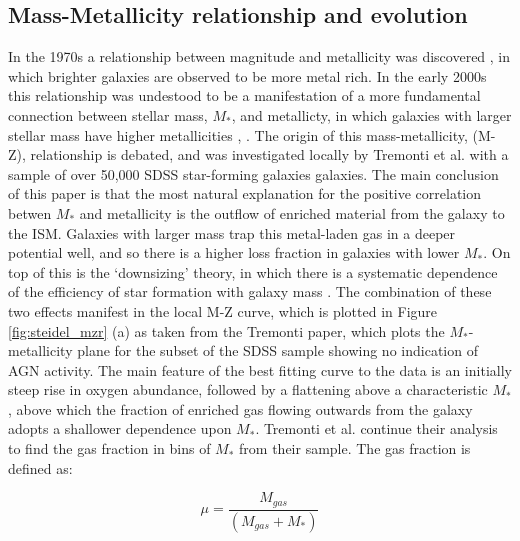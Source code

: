\documentclass{literature}
\begin{document}
\subsection{Mass-Metallicity relationship and evolution}\label{subsec:MZ-relation}
In the 1970s a relationship between magnitude and metallicity was discovered \citep{Lequeux1979}, in which brighter galaxies are observed to be more metal rich. In the early 2000s this relationship was undestood to be a manifestation of a more fundamental connection between stellar mass, $M_{*}$, and metallicty, in which galaxies with larger stellar mass have higher metallicities \citep{Garnett2002}, \citep{Tremonti2004}. The origin of this mass-metallicity, (M-Z), relationship is debated, and was investigated locally by Tremonti et al. with a sample of over 50,000 SDSS star-forming galaxies galaxies. The main conclusion of this paper is that the most natural explanation for the positive correlation betwen $M_{*}$ and metallicity is the outflow of enriched material from the galaxy to the ISM. Galaxies with larger mass trap this metal-laden gas in a deeper potential well, and so there is a higher loss fraction in galaxies with lower $M_{*}$. On top of this is the `downsizing' theory, in which there is a systematic dependence of the efficiency of star formation with galaxy mass \citep{Brooks2007}. The combination of these two effects manifest in the local M-Z curve, which is plotted in Figure \ref{fig:steidel_mzr} (a) as taken from the Tremonti paper, which plots the $M_{*}$-metallicity plane for the subset of the SDSS sample showing no indication of AGN activity. The main feature of the best fitting curve to the data is an initially steep rise in oxygen abundance, followed by a flattening above a characteristic $M_{*}$, above which the fraction of enriched gas flowing outwards from the galaxy adopts a shallower dependence upon $M_{*}$. Tremonti et al. continue their analysis to find the gas fraction in bins of $M_{*}$ from their sample. The gas fraction is defined as: 

\begin{equation}\label{eq:gas_fraction}
	\mu = \frac{M_{gas}}{(M_{gas} + M_{*})}
\end{equation}
\end{document}
